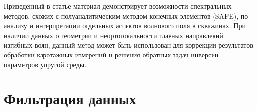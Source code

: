 \documentclass[a4paper,11pt]{article}
\begin{document}

Приведённый в статье материал демонстрирует возможности спектральных методов, схожих с полуаналитическим методом конечных элементов (SAFE), по анализу и интерпретации отдельных аспектов волнового поля в скважинах. При наличии данных о геометрии и неортогональности главных направлений изгибных волн, данный метод может быть использован для коррекции результатов обработки каротажных измерений и решения обратных задач инверсии параметров упругой среды.
%
%


%
%
%



%

\appendix
\section{Фильтрация данных}
\end{document}
